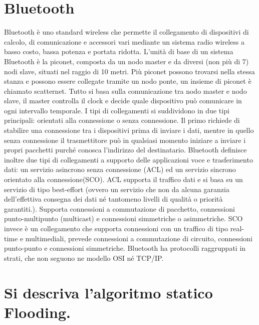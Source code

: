 \section{Bluetooth}

Bluetooth è uno standard wireless che permette il collegamento di dispositivi di calcolo, di comunicazione e accessori vari mediante un sistema radio wireless a basso costo, bassa potenza e portata ridotta.
L’unità di base di un sistema Bluetooth è la piconet, composta da un nodo master e da diversi (non più di 7) nodi slave, situati nel raggio di 10 metri. Più piconet possono trovarsi nella stessa stanza e possono essere collegate tramite un nodo ponte, un insieme di piconet è chiamato scatternet.
Tutto si basa sulla comunicazione tra nodo master e nodo slave, il master controlla il clock e decide quale dispositivo può comunicare in ogni intervallo temporale.
I tipi di collegamenti si suddividono in due tipi principali: orientati alla connessione o senza connessione.
Il primo richiede di stabilire una connessione tra i dispositivi prima di inviare i dati, mentre in quello senza connessione il trasmettitore può in qualsiasi momento iniziare a inviare i propri pacchetti purché conosca l’indirizzo del destinatario.
Bluetooth definisce inoltre due tipi di collegamenti a supporto delle applicazioni voce e trasferimento dati: un servizio asincrono senza connessione (ACL) ed un servizio sincrono orientato alla connessione(SCO).
ACL supporta il traffico dati e si basa su un servizio di tipo best-effort (ovvero un servizio che non da alcuna garanzia dell’effettiva consegna dei dati né tantomeno livelli di qualità o priorità garantiti.).
Supporta connessioni a commutazione di pacchetto, connessioni punto-multipunto (multicast) e connessioni simmetriche o asimmetriche.
SCO invece è un collegamento che supporta connessioni con un traffico di tipo real-time e multimediali, prevede connessioni a commutazione di circuito, connessioni punto-punto e connessioni simmetriche.
Bluetooth ha protocolli raggruppati in strati, che non seguono ne modello OSI né TCP/IP.

\section{Si descriva l’algoritmo statico Flooding.}

